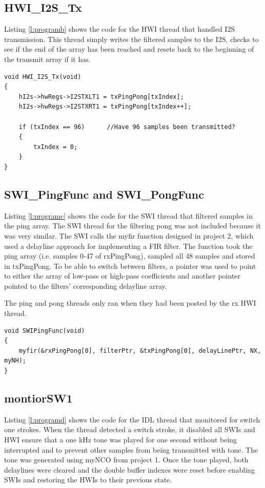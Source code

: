 \documentclass[11pt,pdftex,portrait,letterpaper]{article}
\begin{document}
\subsection{HWI\_I2S\_Tx}

Listing \ref{l:programb} shows the code for the HWI thread that handled I2S transmission. This thread simply writes the filtered samples to the I2S, checks to see if the end of the array has been reached and resets back to the beginning of the transmit array if it has.

\begin{lstlisting}[caption={I2S transmit HWI thread}, label=l:programb]
void HWI_I2S_Tx(void)
{
	hI2s->hwRegs->I2STXLT1 = txPingPong[txIndex];
	hI2s->hwRegs->I2STXRT1 = txPingPong[txIndex++];

	if (txIndex == 96)		//Have 96 samples been transmitted?
	{
		txIndex = 0;
	}
}
\end{lstlisting}

\subsection{SWI\_PingFunc and SWI\_PongFunc}

Listing \ref{l:programc} shows the code for the SWI thread that filtered samples in the ping array. The SWI thread for the filtering pong was not included because it was very similar. The SWI calls the myfir function designed in project 2, which used a delayline approach for implementing a FIR filter. The function took the ping array (i.e. samples 0-47 of rxPingPong), sampled all 48 samples and stored in txPingPong. To be able to switch between filters, a pointer was used to point to either the array of low-pass or high-pass coefficients and another pointer pointed to the filters' corresponding delayline array.

The ping and pong threads only ran when they had been posted by the rx HWI thread.

\begin{lstlisting}[caption={Ping filter SWI thread}, label=l:programc]
void SWIPingFunc(void)
{
	myfir(&rxPingPong[0], filterPtr, &txPingPong[0], delayLinePtr, NX, myNH);
}
\end{lstlisting}

\subsection{montiorSW1}

Listing \ref{l:programd} shows the code for the IDL thread that monitored for switch one strokes. When the thread detected a switch stroke, it disabled all SWIs and HWI ensure that a one kHz tone was played for one second without being interrupted and to prevent other samples from being transmitted with tone. The tone was generated using myNCO from project 1. Once the tone played, both delaylines were cleared and the double buffer indexes were reset before enabling SWIs and restoring the HWIs to their previous state. 
\end{document}
